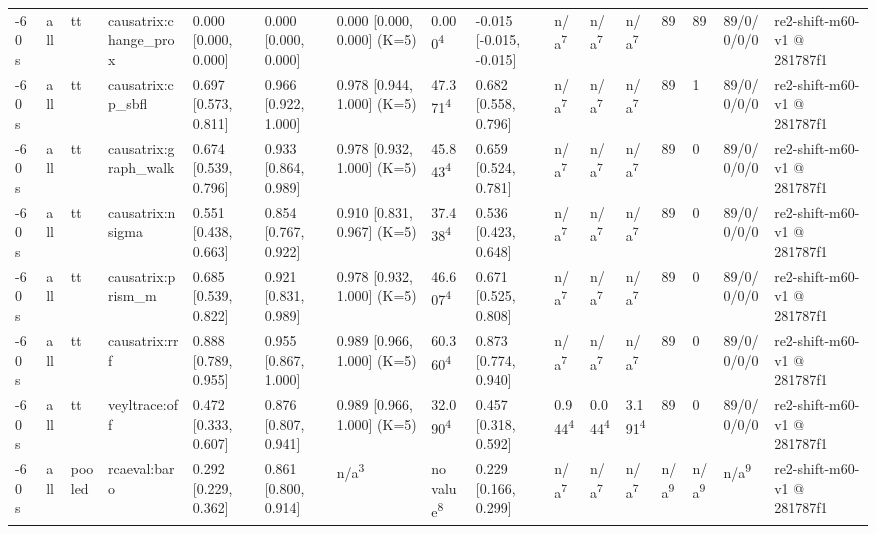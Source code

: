 \begin{table}[t]
\begin{tabular}{llllllllllllllll}
-60 s & all & tt & causatrix:change\_prox & 0.000 [0.000, 0.000] & 0.000 [0.000, 0.000] & 0.000 [0.000, 0.000] (K=5) & 0.000\textsuperscript{4} & -0.015 [-0.015, -0.015] & n/a\textsuperscript{7} & n/a\textsuperscript{7} & n/a\textsuperscript{7} & 89 & 89 & 89/0/0/0/0 & re2-shift-m60-v1 @ 281787f1 \\
-60 s & all & tt & causatrix:cp\_sbfl & 0.697 [0.573, 0.811] & 0.966 [0.922, 1.000] & 0.978 [0.944, 1.000] (K=5) & 47.371\textsuperscript{4} & 0.682 [0.558, 0.796] & n/a\textsuperscript{7} & n/a\textsuperscript{7} & n/a\textsuperscript{7} & 89 & 1 & 89/0/0/0/0 & re2-shift-m60-v1 @ 281787f1 \\
-60 s & all & tt & causatrix:graph\_walk & 0.674 [0.539, 0.796] & 0.933 [0.864, 0.989] & 0.978 [0.932, 1.000] (K=5) & 45.843\textsuperscript{4} & 0.659 [0.524, 0.781] & n/a\textsuperscript{7} & n/a\textsuperscript{7} & n/a\textsuperscript{7} & 89 & 0 & 89/0/0/0/0 & re2-shift-m60-v1 @ 281787f1 \\
-60 s & all & tt & causatrix:nsigma & 0.551 [0.438, 0.663] & 0.854 [0.767, 0.922] & 0.910 [0.831, 0.967] (K=5) & 37.438\textsuperscript{4} & 0.536 [0.423, 0.648] & n/a\textsuperscript{7} & n/a\textsuperscript{7} & n/a\textsuperscript{7} & 89 & 0 & 89/0/0/0/0 & re2-shift-m60-v1 @ 281787f1 \\
-60 s & all & tt & causatrix:prism\_m & 0.685 [0.539, 0.822] & 0.921 [0.831, 0.989] & 0.978 [0.932, 1.000] (K=5) & 46.607\textsuperscript{4} & 0.671 [0.525, 0.808] & n/a\textsuperscript{7} & n/a\textsuperscript{7} & n/a\textsuperscript{7} & 89 & 0 & 89/0/0/0/0 & re2-shift-m60-v1 @ 281787f1 \\
-60 s & all & tt & causatrix:rrf & 0.888 [0.789, 0.955] & 0.955 [0.867, 1.000] & 0.989 [0.966, 1.000] (K=5) & 60.360\textsuperscript{4} & 0.873 [0.774, 0.940] & n/a\textsuperscript{7} & n/a\textsuperscript{7} & n/a\textsuperscript{7} & 89 & 0 & 89/0/0/0/0 & re2-shift-m60-v1 @ 281787f1 \\
-60 s & all & tt & veyltrace:off & 0.472 [0.333, 0.607] & 0.876 [0.807, 0.941] & 0.989 [0.966, 1.000] (K=5) & 32.090\textsuperscript{4} & 0.457 [0.318, 0.592] & 0.944\textsuperscript{4} & 0.044\textsuperscript{4} & 3.191\textsuperscript{4} & 89 & 0 & 89/0/0/0/0 & re2-shift-m60-v1 @ 281787f1 \\
-60 s & all & pooled & rcaeval:baro & 0.292 [0.229, 0.362] & 0.861 [0.800, 0.914] & n/a\textsuperscript{3} & no value\textsuperscript{8} & 0.229 [0.166, 0.299] & n/a\textsuperscript{7} & n/a\textsuperscript{7} & n/a\textsuperscript{7} & n/a\textsuperscript{9} & n/a\textsuperscript{9} & n/a\textsuperscript{9} & re2-shift-m60-v1 @ 281787f1 \\

\end{tabular}
\end{table}
